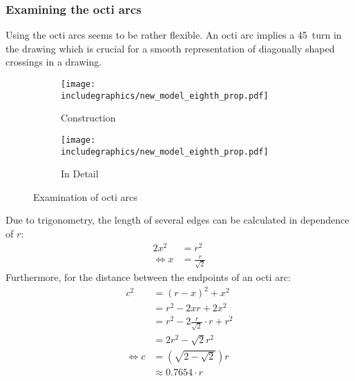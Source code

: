 \subsubsection{Examining the octi arcs}
Using the octi arcs seems to be rather flexible. An octi arc implies a 45\degree~turn in the drawing which is crucial for a smooth representation of diagonally shaped crossings in a drawing.
\begin{figure}[H]
	\centering
	\begin{subfigure}{0.4\textwidth}
		\centering
		\texttt{[image: includegraphics/new\_model\_eighth\_prop.pdf]}
		\caption{Construction}\label{im:exam_eighth_arcs_con}
	\end{subfigure}
	\begin{subfigure}{0.4\textwidth}
		\centering
		\texttt{[image: includegraphics/new\_model\_eighth\_prop.pdf]}
		\caption{In Detail}\label{im:exam_eighth_arcs_detail}
	\end{subfigure}
	\caption{Examination of octi arcs}\label{im:exam_eighth_arcs}
\end{figure}
Due to trigonometry, the length of several edges can be calculated in dependence of $r$:
\begin{align}
2x^2 &= r^2\\
\Leftrightarrow x &= \frac{r}{\sqrt{2}}
\end{align}
Furthermore, for the distance between the endpoints of an octi arc:
\begin{align}
c^2 &= (r-x)^2 + x^2\\
&= r^2 - 2xr + 2x^2\\
&= r^2 - 2\frac{r}{\sqrt{2}}\cdot r + r^2\\
&= 2r^2 - \sqrt{2}r ^2\\
\Leftrightarrow c &= \left(\sqrt{2-\sqrt{2}}\right)r\\
&\approx 0.7654\cdot r
\end{align}
